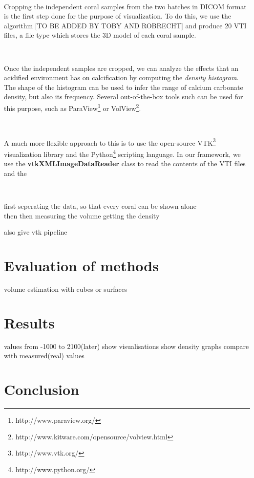 \documentclass[12pt]{article}
\begin{document}
\

Cropping the independent coral samples from the two batches in DICOM format is the first step done for the purpose of visualization. To do this, we use the algorithm [TO BE ADDED BY TOBY AND ROBRECHT] and produce 20 VTI files, a file type which stores the 3D model of each coral sample.

\

Once the independent samples are cropped, we can analyze the effects that an acidified environment has on calcification by computing the \emph{density histogram}. The shape of the histogram can be used to infer the range of calcium carbonate density, but also its frequency. Several out-of-the-box tools such can be used for this purpose, such as ParaView\footnote{http://www.paraview.org/} or VolView\footnote{http://www.kitware.com/opensource/volview.html}.

\

A much more flexible approach to this is to use the open-source VTK\footnote{http://www.vtk.org/} visualization library and the Python\footnote{http://www.python.org/} scripting language. In our framework, we use the {\bf vtkXMLImageDataReader} class to read the contents of the VTI files and the 

\

first seperating the data, so that every coral can be shown alone\\
then then measuring the volume
getting the density 

also give vtk pipeline

\section{Evaluation of methods}
volume estimation with cubes or surfaces

\section{Results}
values from -1000 to 2100(later)
show visualisations
show density graphs
compare with measured(real) values
\section{Conclusion}
\end{document}
